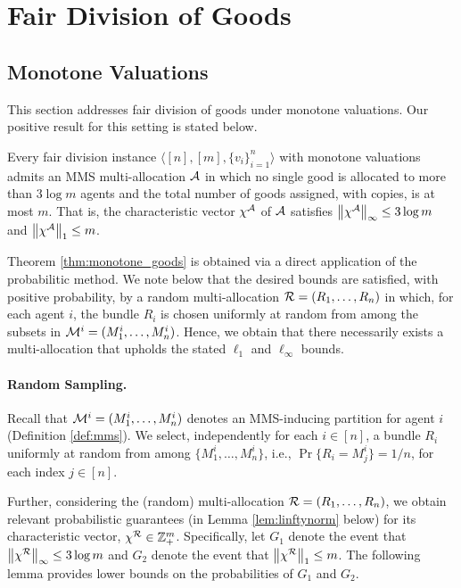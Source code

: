 \section{Fair Division of Goods}\label{sec:goods}

\subsection{Monotone Valuations}
This section addresses fair division of goods under monotone valuations. Our positive result for this setting is stated below. 


\begin{theorem}
\label{thm:monotone_goods}
Every fair division instance $\langle [n], [m], \{v_i\}_{i=1}^n \rangle$ with monotone valuations admits an MMS multi-allocation $\mathcal{A}$ in which no single good is allocated to more than $3 \log  m$ agents and the total number of goods assigned, with copies, is at most $m$. That is, the characteristic vector $\chi^{\mathcal{A}}$ of $\mathcal{A}$ satisfies $\left\|\chi^{\mathcal{A}}\right\|_\infty \leq 3 \log  m$ and $\left\|\chi^{\mathcal{A}}\right\|_1\leq m$. 
\end{theorem}
Theorem \ref{thm:monotone_goods} is obtained via a direct application of the probabilitic method. We note below that the desired bounds are satisfied, with positive probability, by a random multi-allocation $\mathcal{R} = (R_1, \ldots, R_n)$ in which, for each agent $i$, the bundle $R_i$ is chosen uniformly at random from among the subsets in $\mathcal{M}^i=(M^i_1, \ldots, M^i_n)$. Hence, we obtain that there necessarily exists a multi-allocation that upholds the stated $\ell_1$ and $\ell_\infty$ bounds.  

\paragraph{Random Sampling.} Recall that $\mathcal{M}^i=(M^i_1,\dots,M^i_n)$  denotes an MMS-inducing partition for agent $i$ (Definition \ref{def:mms}). We select, independently for each $i \in [n]$, a bundle $R_i$ uniformly at random from among $\{M^i_1,\dots,M^i_n\}$, i.e., $\Pr \{ R_i = M^i_j \} = 1/n$, for each index $j \in [n]$. 

Further, considering the (random) multi-allocation $\mathcal{R}=(R_1,\ldots,R_n)$, we obtain relevant probabilistic guarantees (in Lemma \ref{lem:linftynorm} below) for its characteristic vector, $\chi^{\mathcal{R}} \in \mathbb{Z}_+^m$. Specifically, let $G_1$ denote the event that $\left\|\chi^{\mathcal{R}}\right\|_\infty \leq 3 \log m$ and $G_2$ denote the event that $\left\|\chi^{\mathcal{R}}\right\|_1 \leq m$. The following lemma provides lower bounds on the probabilities of $G_1$ and $G_2$. 

